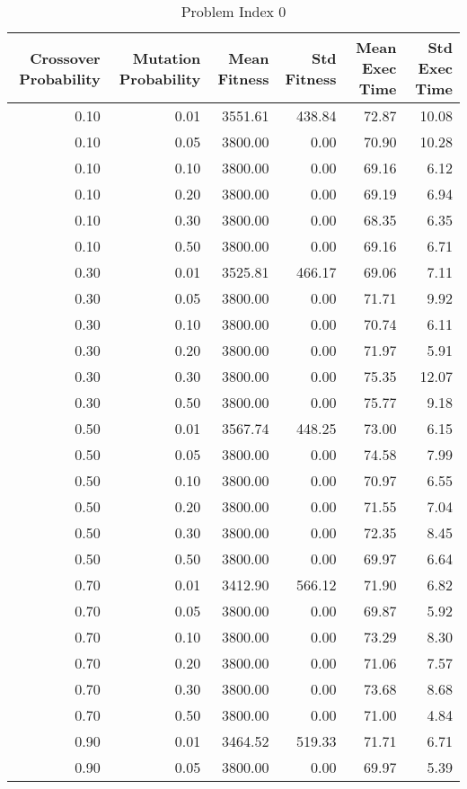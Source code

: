 \begin{table}
\caption{Problem Index 0}
\label{tab:problem_0}
\begin{tabular}{rrrrrr}
\toprule
Crossover Probability & Mutation Probability & Mean Fitness & Std Fitness & Mean Exec Time & Std Exec Time \\
\midrule
0.10 & 0.01 & 3551.61 & 438.84 & 72.87 & 10.08 \\
0.10 & 0.05 & 3800.00 & 0.00 & 70.90 & 10.28 \\
0.10 & 0.10 & 3800.00 & 0.00 & 69.16 & 6.12 \\
0.10 & 0.20 & 3800.00 & 0.00 & 69.19 & 6.94 \\
0.10 & 0.30 & 3800.00 & 0.00 & 68.35 & 6.35 \\
0.10 & 0.50 & 3800.00 & 0.00 & 69.16 & 6.71 \\
0.30 & 0.01 & 3525.81 & 466.17 & 69.06 & 7.11 \\
0.30 & 0.05 & 3800.00 & 0.00 & 71.71 & 9.92 \\
0.30 & 0.10 & 3800.00 & 0.00 & 70.74 & 6.11 \\
0.30 & 0.20 & 3800.00 & 0.00 & 71.97 & 5.91 \\
0.30 & 0.30 & 3800.00 & 0.00 & 75.35 & 12.07 \\
0.30 & 0.50 & 3800.00 & 0.00 & 75.77 & 9.18 \\
0.50 & 0.01 & 3567.74 & 448.25 & 73.00 & 6.15 \\
0.50 & 0.05 & 3800.00 & 0.00 & 74.58 & 7.99 \\
0.50 & 0.10 & 3800.00 & 0.00 & 70.97 & 6.55 \\
0.50 & 0.20 & 3800.00 & 0.00 & 71.55 & 7.04 \\
0.50 & 0.30 & 3800.00 & 0.00 & 72.35 & 8.45 \\
0.50 & 0.50 & 3800.00 & 0.00 & 69.97 & 6.64 \\
0.70 & 0.01 & 3412.90 & 566.12 & 71.90 & 6.82 \\
0.70 & 0.05 & 3800.00 & 0.00 & 69.87 & 5.92 \\
0.70 & 0.10 & 3800.00 & 0.00 & 73.29 & 8.30 \\
0.70 & 0.20 & 3800.00 & 0.00 & 71.06 & 7.57 \\
0.70 & 0.30 & 3800.00 & 0.00 & 73.68 & 8.68 \\
0.70 & 0.50 & 3800.00 & 0.00 & 71.00 & 4.84 \\
0.90 & 0.01 & 3464.52 & 519.33 & 71.71 & 6.71 \\
0.90 & 0.05 & 3800.00 & 0.00 & 69.97 & 5.39 \\

\end{tabular}
\end{table}
